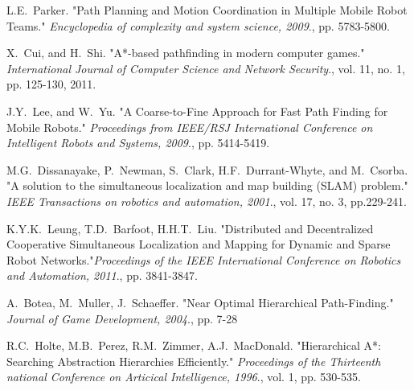 \documentclass{article}
\begin{document}
\begin{thebibliography}{60}
L.E.~Parker. "Path Planning and Motion Coordination in Multiple Mobile Robot Teams." \emph{Encyclopedia of complexity and system science, 2009}., pp. 5783-5800.


X.~Cui, and H.~Shi. "A*-based pathfinding in modern computer games." \emph{International Journal of Computer Science and Network Security}., vol. 11, no. 1, pp. 125-130, 2011.

J.Y.~Lee, and W.~Yu. "A Coarse-to-Fine Approach for Fast Path Finding for Mobile Robots." \emph{Proceedings from IEEE/RSJ International Conference on Intelligent Robots and Systems, 2009}., pp. 5414-5419. 


M.G.~Dissanayake, P.~Newman, S.~Clark, H.F.~Durrant-Whyte, and M.~Csorba. "A solution to the simultaneous localization and map building (SLAM) problem." \emph{IEEE Transactions on robotics and automation, 2001}., vol. 17, no. 3, pp.229-241.

K.Y.K.~Leung, T.D.~Barfoot, H.H.T.~Liu. "Distributed and Decentralized Cooperative Simultaneous Localization and Mapping for Dynamic and Sparse Robot Networks."\emph{Proceedings of the IEEE International Conference on Robotics and Automation, 2011}., pp. 3841-3847.

A.~Botea, M.~Muller, J.~Schaeffer. "Near Optimal Hierarchical Path-Finding." \emph{Journal of Game Development, 2004}., pp. 7-28

R.C.~Holte, M.B.~Perez, R.M.~Zimmer, A.J.~MacDonald. "Hierarchical A*: Searching Abstraction Hierarchies Efficiently." \emph{Proceedings of the Thirteenth national Conference on Articical Intelligence, 1996}., vol. 1, pp. 530-535.
\end{thebibliography}

\newpage


\end{document}

